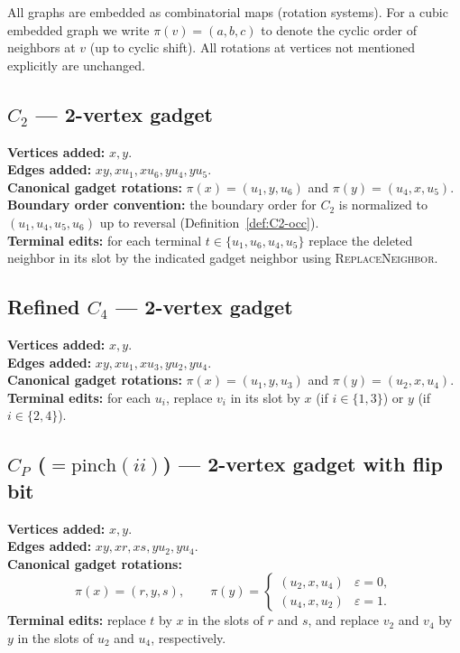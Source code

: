 \documentclass[12pt]{article}
\theoremstyle{definition}
\newcommand{\RefinedCFourGadgetVertices}{2}
\newcommand{\CtwoGadgetVertices}{2}
\newcommand{\PinchGadgetVertices}{2}
\begin{document}
All graphs are embedded as combinatorial maps (rotation systems). For a cubic embedded graph we write $\pi(v)=(a,b,c)$ to denote the cyclic order of neighbors at $v$ (up to cyclic shift). All rotations at vertices not mentioned explicitly are unchanged.

\subsection{\texorpdfstring{$C_2$}{C2} --- \texorpdfstring{\CtwoGadgetVertices}{2}-vertex gadget}
\label{app:rot-c2}

\noindent\textbf{Vertices added:} $x,y$. \\
\noindent\textbf{Edges added:} $xy, xu_1, xu_6, yu_4, yu_5$. \\
\noindent\textbf{Canonical gadget rotations:} $\pi(x)=(u_1,y,u_6)$ and $\pi(y)=(u_4,x,u_5)$. \\
\noindent\textbf{Boundary order convention:} the boundary order for $C_2$ is normalized to $(u_1,u_4,u_5,u_6)$ up to reversal (Definition~\ref{def:C2-occ}). \\
\noindent\textbf{Terminal edits:} for each terminal $t\in\{u_1,u_6,u_4,u_5\}$ replace the deleted neighbor in its slot by the indicated gadget neighbor using \textsc{ReplaceNeighbor}.

\subsection{Refined \texorpdfstring{$C_4$}{C4} --- \texorpdfstring{\RefinedCFourGadgetVertices}{2}-vertex gadget}
\label{app:rot-refinedc4}

\noindent\textbf{Vertices added:} $x,y$. \\
\noindent\textbf{Edges added:} $xy, xu_1, xu_3, yu_2, yu_4$. \\
\noindent\textbf{Canonical gadget rotations:} $\pi(x)=(u_1,y,u_3)$ and $\pi(y)=(u_2,x,u_4)$. \\
\noindent\textbf{Terminal edits:} for each $u_i$, replace $v_i$ in its slot by $x$ (if $i\in\{1,3\}$) or $y$ (if $i\in\{2,4\}$).

\subsection{\texorpdfstring{$C_P$}{CP} (\texorpdfstring{$=\mathrm{pinch}(ii)$}{=pinch(ii)}) --- \texorpdfstring{\PinchGadgetVertices}{2}-vertex gadget with flip bit}
\label{app:rot-pinch}

\noindent\textbf{Vertices added:} $x,y$. \\
\noindent\textbf{Edges added:} $xy, xr, xs, yu_2, yu_4$. \\
\noindent\textbf{Canonical gadget rotations:}
\[
\pi(x)=(r,y,s),
\qquad
\pi(y)=
\begin{cases}
(u_2,x,u_4) & \varepsilon=0,\\
(u_4,x,u_2) & \varepsilon=1.
\end{cases}
\]
\noindent\textbf{Terminal edits:} replace $t$ by $x$ in the slots of $r$ and $s$, and replace $v_2$ and $v_4$ by $y$ in the slots of $u_2$ and $u_4$, respectively.
\end{document}

